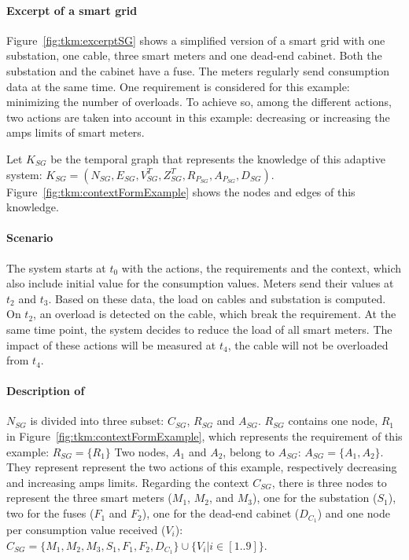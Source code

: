 \paragraph{Excerpt of a smart grid}
Figure~\ref{fig:tkm:excerptSG} shows a simplified version of a smart grid with one substation, one cable, three smart meters and one dead-end cabinet.
Both the substation and the cabinet have a fuse.
The meters regularly send consumption data at the same time.
One requirement is considered for this example: minimizing the number of overloads.
To achieve so, among the different actions, two actions are taken into account in this example: decreasing or increasing the amps limits of smart meters.

Let $K_{SG}$ be the temporal graph that represents the knowledge of this adaptive system: $K_{SG} = (N_{SG}, E_{SG}, V^T_{SG}, Z^T_{SG}, R_{P_{SG}}, A_{P_{SG}}, D_{SG})$.
Figure~\ref{fig:tkm:contextFormExample} shows the nodes and edges of this knowledge.

\paragraph{Scenario}
The system starts at $t_0$ with the actions, the requirements and the context, which also include initial value for the consumption values.
Meters send their values at $t_2$ and $t_3$.
Based on these data, the load on cables and substation is computed.
On $t_2$, an overload is detected on the cable, which break the requirement.
At the same time point, the system decides to reduce the load of all smart meters.
The impact of these actions will be measured at $t_4$, \ie the cable will not be overloaded from $t_4$.

\paragraph{Description of }

$N_{SG}$ is divided into three subset: $C_{SG}$, $R_{SG}$ and $A_{SG}$.
$R_{SG}$ contains one node, $R_1$ in Figure~\ref{fig:tkm:contextFormExample}, which represents the requirement of this example: $R_{SG} = \{R_1\}$
Two nodes, $A_1$ and $A_2$, belong to $A_{SG}$: $A_{SG} = \{ A_1, A_2\}$.
They represent represent the two actions of this example, respectively decreasing and increasing amps limits.
Regarding the context $C_{SG}$, there is three nodes to represent the three smart meters ($M_1$, $M_2$, and $M_3$), one for the substation ($S_1$), two for the fuses ($F_1$ and $F_2$), one for the dead-end cabinet ($D_{C_1}$) and one node per consumption value received ($V_i$): $C_{SG} = \{M_1, M_2, M_3, S_1, F_1, F_2, D_{C_1}\} \cup \{ V_i | i \in [1..9]\}$.

